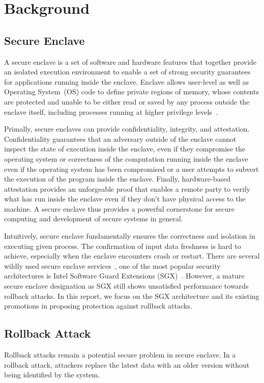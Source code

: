 \section{Background}
\subsection{Secure Enclave}
A secure enclave is a set of software and hardware features that together provide an isolated execution environment to enable a set of strong security guarantees for applications running inside the enclave. Enclave allows user-level as well as Operating System~(OS) code to define private regions of memory, whose contents are protected and unable to be either read or saved by any process outside the enclave itself, including processes running at higher privilege levels~\cite{}. 

Primally, secure enclaves can provide confidentiality, integrity, and attestation. Confidentiality guarantees that an adversary outside of the enclave cannot inspect the state of execution inside the enclave, even if they compromise the operating system or correctness of the computation running inside the enclave even if the operating system has been compromised or a user attempts to subvert the execution of the program inside the enclave. Finally, hardware-based attestation provides an unforgeable proof that enables a remote party to verify what has run inside the enclave even if they don’t have physical access to the machine. A secure enclave thus provides a powerful cornerstone for secure computing and development of secure systems in general. 


Intuitively, secure enclave fundamentally ensures the correctness and isolation in executing given process. The confirmation of input data freshness is hard to achieve, especially when the enclave encounters crash or restart. There are several wildly used secure enclave services~\cite{}, one of the most popular security architectures is Intel Software Guard Extensions (SGX)~\cite{}. However, a mature secure enclave designation as SGX still shows unsatisfied performance towards rollback attacks. In this report, we focus on the SGX architecture and its existing promotions in proposing protection against rollback attacks.


\subsection{Rollback Attack}

Rollback attacks remain a potential secure problem in secure enclave. In a rollback attack, attackers replace the latest data with an older version without being identified by the system. 

